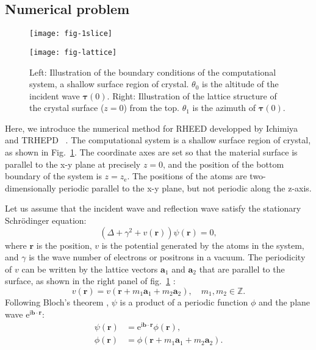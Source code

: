 \documentclass[preprint, 5p, times, sort&compress]{elsarticle}
\def\vecr{\bm{r}}
\def\veca{\bm{a}}
\def\vecb{\bm{b}}
\def\vtau{\bm{\tau}}
\def\zbot{z_\text{e}}
\def\imag{\mathrm{i}}
\def\ee{\mathrm{e}}
\begin{document}
        \subsection{Numerical problem}
        \begin{figure}
                \begin{minipage}{0.48\linewidth}
                        \centering\texttt{[image: fig-1slice]}
                \end{minipage}%
                \hspace{0.04\linewidth}%
                \begin{minipage}{0.48\linewidth}
                        \centering\texttt{[image: fig-lattice]}
                \end{minipage}
                \caption{Left: Illustration of the boundary conditions of the computational system, a shallow surface region of crystal.
                        $\theta_0$ is the altitude of the incident wave $\vtau(0)$.
                        Right: Illustration of the lattice structure of the crystal surface ($z=0$) from the top.
                        $\theta_1$ is the azimuth of $\vtau(0)$.} \label{fig:lattice}
        \end{figure}
        Here, we introduce the numerical method for RHEED developped by Ichimiya~\cite{Ichimiya1983,Ichimiya2004} and TRHEPD  ~\cite{Fukaya2019a}.
        The computational system is a shallow surface region of crystal, as shown in Fig.~\ref{fig:lattice}. The coordinate axes are set so that the material surface is parallel to the x-y plane at precisely $z=0$, and the position of the bottom boundary of the system is $z=\zbot$.
        The positions of the atoms are two-dimensionally periodic parallel to the x-y plane,
        but not periodic along the z-axis.

        Let us assume that the incident wave and reflection wave satisfy the stationary Schr\"odinger equation:
        \begin{equation}
                \left(\Delta + \gamma^2 + v(\vecr)\right) \psi(\vecr) = 0, \label{eq:sch1}
        \end{equation}
        where $\vecr$ is the position,
        $v$ is the potential generated by the atoms in the system, and
        $\gamma$ is the wave number of electrons or positrons in a vacuum.
        The periodicity of $v$ can be written by the  lattice vectors $\veca_1$ and $\veca_2$ that are parallel to the surface, as shown in the right panel of fig.~\ref{fig:lattice} :
        \begin{equation}
                v(\vecr) = v(\vecr + m_1\veca_1+m_2\veca_2), \quad m_1, m_2 \in \mathbb{Z}. \label{eq:pot1}
        \end{equation}
        Following Bloch's theorem \cite{KITTEL-TEXT,Ichimiya2004}, 
        $\psi$ is a product of a periodic function $\phi$ and the plane wave $\ee^{\imag\vecb\cdot\vecr}$:
        \begin{align}
                \psi(\vecr) &= \ee^{\imag\vecb\cdot\vecr}\phi(\vecr),\\
                \phi(\vecr) &= \phi(\vecr + m_1\veca_1 + m_2\veca_2). \label{eq:bloch2}
        \end{align}
\end{document}
